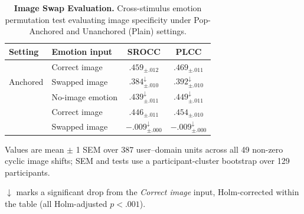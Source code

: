 \begin{table}[t]
\centering
\small
\setlength{\tabcolsep}{6pt}
\renewcommand{\arraystretch}{0.95}
\begin{threeparttable}
\caption{\textbf{Image Swap Evaluation.} Cross-stimulus emotion permutation test evaluating image specificity under Pop-Anchored and Unanchored (Plain) settings.}
\label{tab:image_swap}
\begin{tabular}{ll cc}
\toprule
Setting & Emotion input & SROCC & PLCC \\
\midrule
\multirow{3}{*}{Anchored} 
& Correct image    & $\bm{.459_{\pm .012}}$ & $\bm{.469_{\pm .011}}$ \\
& Swapped image    & $.384_{\pm .010}^{\downarrow}$ & $.392_{\pm .010}^{\downarrow}$ \\
& No-image emotion & $.439_{\pm .011}^{\downarrow}$ & $.449_{\pm .011}^{\downarrow}$ \\
\addlinespace
\multirow{2}{*}{Unanchored} 
& Correct image    & $\bm{.446_{\pm .011}}$ & $\bm{.454_{\pm .010}}$ \\
& Swapped image    & $-.009_{\pm .000}^{\downarrow}$ & $-.009_{\pm .000}^{\downarrow}$ \\
\bottomrule
\end{tabular}
\begin{tablenotes}[flushleft]\footnotesize
    \item Values are mean $\pm$ 1 SEM over 387 user--domain units across all 49 non-zero cyclic image shifts; SEM and tests use a participant-cluster bootstrap over 129 participants.
    \item $\downarrow$ marks a significant drop from the \emph{Correct image} input, Holm-corrected within the table (all Holm-adjusted $p<.001$).
\end{tablenotes}
\end{threeparttable}
\end{table}
